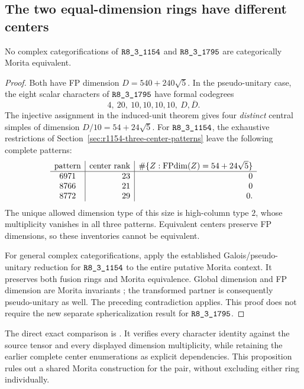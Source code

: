 \subsection{The two equal-dimension rings have different centers}
\label{subsec:research-1154-1795-morita}

\begin{proposition}
\label{prop:research-1154-1795-no-morita}
No complex categorifications of $\sha{R8_3_1154}$ and
$\sha{R8_3_1795}$ are categorically Morita equivalent.
\end{proposition}
\begin{proof}
Both have FP dimension $D=540+240\sqrt5$.  In the pseudo-unitary
case, the eight scalar characters of $\sha{R8_3_1795}$ have formal
codegrees
\[
 4,\ 20,\ 10,10,10,10,\ D,\overline D.
\]
The injective assignment in the induced-unit theorem
\cite[Theorem~2.13]{OstrikPiv3} gives four \emph{distinct} central
simples of dimension $D/10=54+24\sqrt5$.
For $\sha{R8_3_1154}$, the exhaustive restrictions of
Section~\ref{sec:r1154-three-center-patterns} leave the following
complete patterns:
\[
\begin{array}{c|r|r}
\text{pattern}&\text{center rank}&
 \#\{Z:\operatorname{FPdim}(Z)=54+24\sqrt5\}\\\hline
6971&23&0\\8766&21&0\\8772&29&0.
\end{array}
\]
The unique allowed dimension type of this size is high-column
type $2$, whose multiplicity vanishes in all three patterns.
Equivalent centers preserve FP dimensions, so these inventories
cannot be equivalent.

For general complex categorifications, apply the established
Galois/pseudo-unitary reduction for $\sha{R8_3_1154}$ to the entire
putative Morita context.  It preserves both fusion rings and Morita
equivalence.  Global dimension and FP dimension are Morita invariants
\cite[Theorem~2.15 and Corollary~8.14]{ENO}; the transformed partner
is consequently pseudo-unitary as well.  The preceding contradiction
applies.  This proof does not require the new separate sphericalization
result for $\sha{R8_3_1795}$.
\end{proof}

The direct exact comparison is
.
It verifies every character identity against the source tensor and
every displayed dimension multiplicity, while retaining the earlier
complete center enumerations as explicit dependencies.  This
proposition rules out a shared Morita construction for the pair,
without excluding either ring individually.


